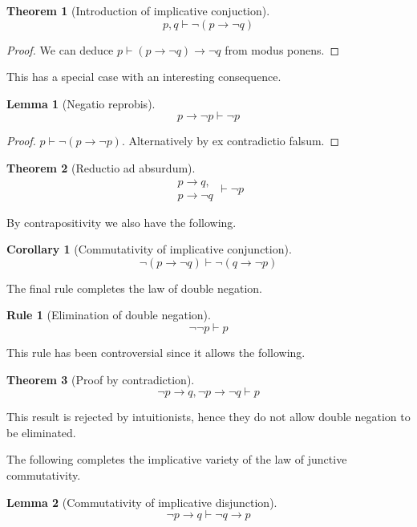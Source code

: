 \documentclass{amsbook}
\newcommand{\infers}{\mathrel\vdash}
\newcommand{\then}{\mathrel\rightarrow}
\theoremstyle{definition}
\newtheorem{frule}{Rule}[chapter]
\newtheorem{thm}{Theorem}[section]
\newtheorem{lmm}{Lemma}[section]
\newtheorem{crl}{Corollary}[section]
\begin{document}
\begin{thm}[Introduction of implicative conjuction]
    $$p, q \infers \neg(p \then \neg q)$$
    \begin{proof}
        We can deduce $p \infers (p \then \neg q) \then \neg q$ from modus ponens.
    \end{proof}
\end{thm}

This has a special case with an interesting consequence.

\begin{lmm}[Negatio reprobis]
    $$p \then \neg p \infers \neg p$$
    \begin{proof}
        $p \infers \neg(p \then \neg p)$.
        Alternatively by ex contradictio falsum.
    \end{proof}
\end{lmm}

\begin{thm}[Reductio ad absurdum]
    $$\begin{aligned}
            p \then q, \\ p \then \neg q
        \end{aligned} \infers \neg p$$
\end{thm}

By contrapositivity we also have the following.

\begin{crl}[Commutativity of implicative conjunction]
    $$\neg(p \then \neg q) \infers \neg(q \then \neg p)$$
\end{crl}

The final rule completes the law of double negation.

\begin{frule}[Elimination of double negation]
    $${\neg\neg p} \infers p$$
\end{frule}

This rule has been controversial since it allows the following.

\begin{thm}[Proof by contradiction]
    $$\neg p \then q, \neg p \then \neg q \infers p$$
\end{thm}

This result is rejected by intuitionists, hence they do not allow double negation to be eliminated.

The following completes the implicative variety of the law of junctive commutativity.

\begin{lmm}[Commutativity of implicative disjunction]
    $$\neg p \then q \infers \neg q \then p$$
\end{lmm}
\end{document}

